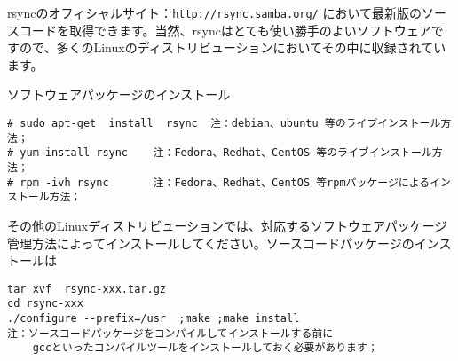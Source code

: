rsyncのオフィシャルサイト：\texttt{http://rsync.samba.org/} において最新版のソースコードを取得できます。当然、rsyncはとても使い勝手のよいソフトウェアですので、多くのLinuxのディストリビューションにおいてその中に収録されています。

ソフトウェアパッケージのインストール

\begin{lstlisting}[numbers=none]
# sudo apt-get  install  rsync  注：debian、ubuntu 等のライブインストール方法；
# yum install rsync    注：Fedora、Redhat、CentOS 等のライブインストール方法；
# rpm -ivh rsync       注：Fedora、Redhat、CentOS 等rpmパッケージによるインストール方法；
\end{lstlisting}

その他のLinuxディストリビューションでは、対応するソフトウェアパッケージ管理方法によってインストールしてください。ソースコードパッケージのインストールは



\begin{lstlisting}[numbers=none]
tar xvf  rsync-xxx.tar.gz
cd rsync-xxx
./configure --prefix=/usr  ;make ;make install
注：ソースコードパッケージをコンパイルしてインストールする前に
    gccといったコンパイルツールをインストールしておく必要があります；
\end{lstlisting}
